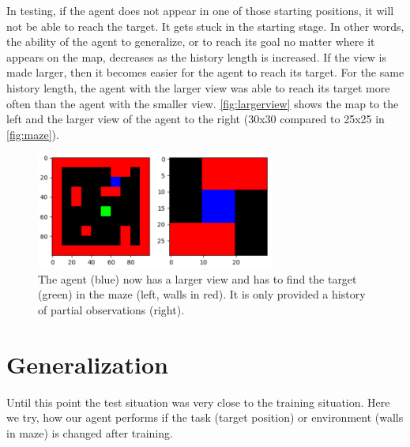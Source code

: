\documentclass[a4paper,14pt]{article}
\begin{document}
In testing, if the agent does not appear in one of those starting positions, it will not be able to reach the target. It gets stuck in the starting stage.
In other words, the ability of the agent to generalize, or to reach its goal no matter where it appears on the map, decreases as the history length is increased.
If the view is made larger, then it becomes easier for the agent to reach its target. For the same history length, the agent with the larger view was able to reach its target more often than the agent with the smaller view. \autoref{fig:largerview} shows the map to the left and the larger view of the agent to the right (30x30 compared to 25x25 in \autoref{fig:maze}).

\begin{figure}[h]
  \centering
  \includegraphics[width=0.7\textwidth]{larger_view}
  \caption{The agent (blue) now has a larger view and has to find the target (green) in the maze (left,
    walls in red). It is only provided a history of partial observations
    (right).}
  \label{fig:largerview}
\end{figure}

\section{Generalization}\label{sec:generalization}

Until this point the test situation was very close to the training situation.
Here we try, how our agent performs if the task (target position) or
environment (walls in maze) is changed after training.
\end{document}
